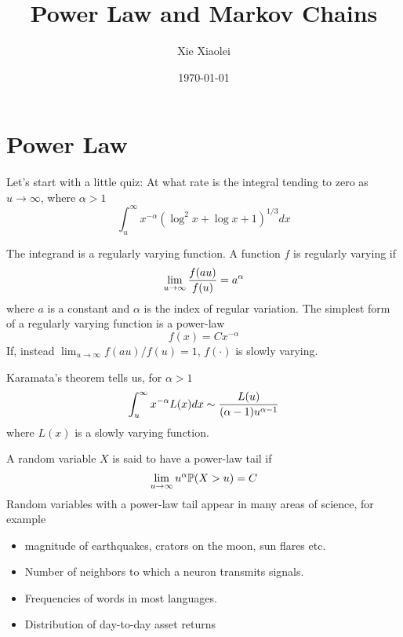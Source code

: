 \documentclass{beamer}
\title{Power Law and Markov Chains} %
\author{Xie Xiaolei} %
\institute[UCPH] %
{
Copenhagen University  \\ %
\medskip
\textit{hnq365@math.ku.dk} %
}
\date{\today} %
\begin{document}
\begin{frame}
\titlepage %
\end{frame}


\section{Power Law}
\begin{frame}
  Let's start with a little quiz: At what rate is the integral tending
  to zero as $u \to \infty$, where $\alpha > 1$
  \[
  \int_{u}^\infty x^{-\alpha} (\log^2 x + \log x + 1)^{1/3} dx
  \]
\end{frame}

\begin{frame}
  The integrand is a regularly varying function. A function $f$ is
  regularly varying if
  \[
  \lim_{u \to \infty} {
    f (au) \over f(u)
  } = a^\alpha
  \]
  where $a$ is a constant and $\alpha$ is the index of regular
  variation. The simplest form of a regularly varying function is a
  power-law
  \[
  f(x) = C x^{-\alpha}
  \]
  If, instead $\lim_{u \to \infty} f(au)/f(u) = 1$, $f(\cdot)$ is
  slowly varying.
\end{frame}

\begin{frame}
  Karamata's theorem tells us, for $\alpha > 1$
  \[
  \int_{u}^\infty x^{-\alpha} L(x) dx \sim {L(u) \over (\alpha - 1) u^{\alpha-1}}
  \]
  where $L(x)$ is a slowly varying function.
\end{frame}

\begin{frame}
  A random variable $X$ is said to have a power-law tail if
  \[
  \lim_{u \to \infty} u^{\alpha} \P(X > u) = C 
  \]
  Random variables with a power-law tail appear in many
  areas of science, for example
  \begin{itemize}
  \item magnitude of earthquakes, crators on the moon, sun flares etc.
  \item Number of neighbors to which a neuron transmits signals.
  \item Frequencies of words in most languages.
  \item Distribution of day-to-day asset returns
  \end{itemize}
\end{frame}
\end{document}
